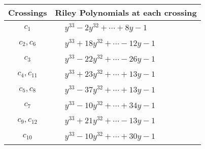 \documentclass[1p]{elsarticle_modified}
\theoremstyle{definition}
\begin{document}
\begin{tabular}{m{50pt}|m{274pt}}
Crossings & \hspace{64pt}Riley Polynomials at each crossing \\
\hline $$\begin{aligned}c_{1}\end{aligned}$$&$\begin{aligned}
&y^{33}-2 y^{32}+\cdots+8 y-1
\end{aligned}$\\
\hline $$\begin{aligned}c_{2},c_{6}\end{aligned}$$&$\begin{aligned}
&y^{33}+18 y^{32}+\cdots-12 y-1
\end{aligned}$\\
\hline $$\begin{aligned}c_{3}\end{aligned}$$&$\begin{aligned}
&y^{33}-22 y^{32}+\cdots-26 y-1
\end{aligned}$\\
\hline $$\begin{aligned}c_{4},c_{11}\end{aligned}$$&$\begin{aligned}
&y^{33}+23 y^{32}+\cdots+13 y-1
\end{aligned}$\\
\hline $$\begin{aligned}c_{5},c_{8}\end{aligned}$$&$\begin{aligned}
&y^{33}-37 y^{32}+\cdots+13 y-1
\end{aligned}$\\
\hline $$\begin{aligned}c_{7}\end{aligned}$$&$\begin{aligned}
&y^{33}-10 y^{32}+\cdots+34 y-1
\end{aligned}$\\
\hline $$\begin{aligned}c_{9},c_{12}\end{aligned}$$&$\begin{aligned}
&y^{33}+21 y^{32}+\cdots-13 y-1
\end{aligned}$\\
\hline $$\begin{aligned}c_{10}\end{aligned}$$&$\begin{aligned}
&y^{33}-10 y^{32}+\cdots+30 y-1
\end{aligned}$\\
\hline
\end{tabular}
\vskip 2pc
\end{document}

